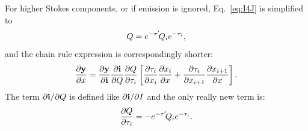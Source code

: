 For higher Stokes components, or if emission is ignored, Eq.~\ref{eq:I4J} is
simplified to
\begin{equation}
  \label{eq:Q4J}
  Q = e^{-\tau'}\!Q_{i}e^{-\tau_{i}},
\end{equation}
and the chain rule expression is correspondingly shorter:
\begin{equation}
  \frac{\partial\mathbf{y}}{\partial x} =  
  \frac{\partial\mathbf{y}}{\partial\mathbf{i}}
  \frac{\partial\mathbf{i}}{\partial Q} 
  \frac{\partial Q}{\partial\tau_{i}}
  \left[
    \frac{\partial\tau_{i}}{\partial x_{i}}
    \frac{\partial x_{i}}{\partial x} + 
    \frac{\partial\tau_{i}}{\partial x_{i+1}}  
    \frac{\partial x_{i+1}}{\partial x} 
  \right].
\end{equation}
The term $\partial\mathbf{i}/\partial Q$ is defined like
$\partial\mathbf{i}/\partial I$ and the only really new term is:
\begin{equation}
  \frac{\partial Q}{\partial\tau_{i}} 
      = -e^{-\tau'}\!Q_{i}e^{-\tau_{i}}.
\end{equation}


